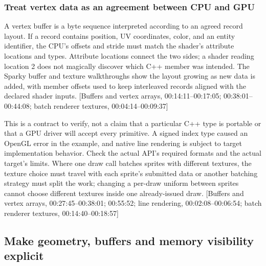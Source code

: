 \subsubsection{Treat vertex data as an agreement between CPU and GPU}\label{06-engine-ii-ch025-treat-vertex-data-as-an-agreement-between-cpu-and-gpu}

\hypertarget{06-engine-ii-ch025-treat-vertex-data-as-an-agreement-between-cpu-and-gpu}{}

A vertex buffer is a byte sequence interpreted according to an agreed record layout. If a record contains position, UV coordinates, color, and an entity identifier, the CPU's offsets and stride must match the shader's attribute locations and types. Attribute locations connect the two sides; a shader reading location 2 does not magically discover which C++ member was intended. The Sparky buffer and texture walkthroughs show the layout growing as new data is added, with member offsets used to keep interleaved records aligned with the declared shader inputs. {[}Buffers and vertex arrays, 00:14:11--00:17:05; 00:38:01--00:44:08; batch renderer textures, 00:04:14--00:09:37{]}

This is a contract to verify, not a claim that a particular C++ type is portable or that a GPU driver will accept every primitive. A signed index type caused an OpenGL error in the example, and native line rendering is subject to target implementation behavior. Check the actual API's required formats and the actual target's limits. Where one draw call batches sprites with different textures, the texture choice must travel with each sprite's submitted data or another batching strategy must split the work; changing a per-draw uniform between sprites cannot choose different textures inside one already-issued draw. {[}Buffers and vertex arrays, 00:27:45--00:38:01; 00:55:52; line rendering, 00:02:08--00:06:54; batch renderer textures, 00:14:40--00:18:57{]}

\subsection{Make geometry, buffers and memory visibility explicit}\label{06-engine-ii-ch025-make-geometry-buffers-and-memory-visibility-explicit}

\hypertarget{06-engine-ii-ch025-make-geometry-buffers-and-memory-visibility-explicit}{}

